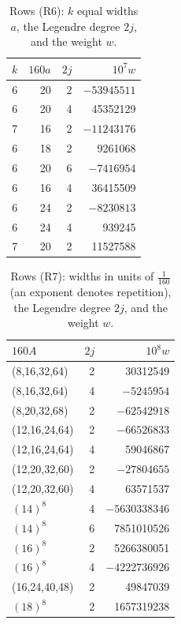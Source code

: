 \documentclass[11pt,colorlinks]{charlie}
\begin{document}
\begin{table}[ht]\centering\small
\caption{Rows (R6): $k$ equal widths $a$, the Legendre degree $2j$, and the weight $w$.}\label{tab:septic}
\begin{tabular}{@{}rrrr@{}}
\toprule
$k$&$160a$&$2j$&$10^7w$\\\midrule
6 & 20 & 2 & $-53945511$\\
6 & 20 & 4 & 45352129\\
7 & 16 & 2 & $-11243176$\\
6 & 18 & 2 & 9261068\\
6 & 20 & 6 & $-7416954$\\
6 & 16 & 4 & 36415509\\
6 & 24 & 2 & $-8230813$\\
6 & 24 & 4 & 939245\\
7 & 20 & 2 & 11527588\\
\bottomrule
\end{tabular}
\end{table}

\begin{table}[ht]\centering\small
\caption{Rows (R7): widths in units of $\frac1{160}$ (an exponent denotes repetition), the Legendre degree $2j$, and the weight $w$.}\label{tab:octic}
\begin{tabular}{@{}lrr@{}}
\toprule
$160A$&$2j$&$10^8w$\\\midrule
(8,16,32,64) & 2 & 30312549\\
(8,16,32,64) & 4 & $-5245954$\\
(8,20,32,68) & 2 & $-62542918$\\
(12,16,24,64) & 2 & $-66526833$\\
(12,16,24,64) & 4 & 59046867\\
(12,20,32,60) & 2 & $-27804655$\\
(12,20,32,60) & 4 & 63571537\\
$(14)^{8}$ & 4 & $-5630338346$\\
$(14)^{8}$ & 6 & 7851010526\\
$(16)^{8}$ & 2 & 5266380051\\
$(16)^{8}$ & 4 & $-4222736926$\\
(16,24,40,48) & 2 & 49847039\\
$(18)^{8}$ & 2 & 1657319238\\
\bottomrule
\end{tabular}
\end{table}
\end{document}
